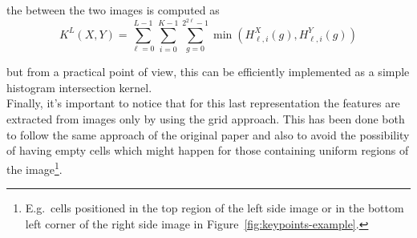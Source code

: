 \documentclass[../main.tex]{subfiles}
\begin{document}
the  between the two images is computed as
\begin{equation}
  K^{L}(X,Y) = 
  \sum_{\ell=0}^{L-1}
  \sum_{i=0}^{K-1}
  \sum_{g=0}^{2^{2 \ell}-1}
  \min\left(H_{\ell, i}^{X}(g), H_{\ell, i}^{Y}(g)\right)
\end{equation}

but from a practical point of view, this can be efficiently implemented as a
simple histogram intersection kernel.\\
Finally, it's important to notice that for this last representation the features
are extracted from images only by using the grid approach. This has been done
both to follow the same approach of the original paper and also to avoid the
possibility of having empty cells which might happen for those containing
uniform regions of the image\footnote{E.g.\ cells positioned in the top region
	of the left side image or in the bottom left corner of the right side
image in Figure~\ref{fig:keypoints-example}.}.
\end{document}
